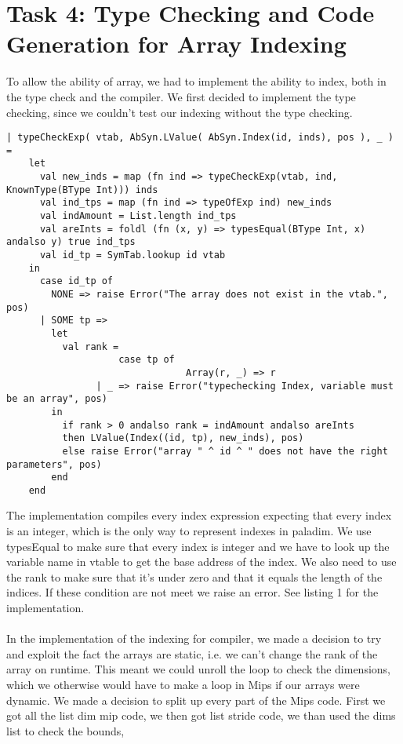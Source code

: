 \section{Task 4: Type Checking and Code Generation for Array Indexing}

To allow the ability of array, we had to implement the ability to index, both in the type check and the compiler. We first decided to implement
the type checking, since we couldn't test our indexing without the type checking.

\begin{lstlisting}[style=MLStyle, caption=type checking for indexing]		
| typeCheckExp( vtab, AbSyn.LValue( AbSyn.Index(id, inds), pos ), _ ) =
    let 
      val new_inds = map (fn ind => typeCheckExp(vtab, ind, KnownType(BType Int))) inds
      val ind_tps = map (fn ind => typeOfExp ind) new_inds
      val indAmount = List.length ind_tps
      val areInts = foldl (fn (x, y) => typesEqual(BType Int, x) andalso y) true ind_tps
      val id_tp = SymTab.lookup id vtab
    in
      case id_tp of 
        NONE => raise Error("The array does not exist in the vtab.", pos)
      | SOME tp => 
        let
          val rank = 
					case tp of
								Array(r, _) => r
                | _ => raise Error("typechecking Index, variable must be an array", pos)
        in
          if rank > 0 andalso rank = indAmount andalso areInts 
          then LValue(Index((id, tp), new_inds), pos)
          else raise Error("array " ^ id ^ " does not have the right parameters", pos)
        end
    end	
\end{lstlisting}
The implementation compiles every index expression expecting that every index is an integer, which is the only way to represent indexes in 
paladim. We use typesEqual to make sure that every index is integer and we have to look up the variable name in vtable to get the base address of the index. 
We also need to use the rank to make sure that it's under zero and that it equals the length of the indices. If these condition are not meet we raise an error. 
See listing 1 for the implementation.
\\
\\
In the implementation of the indexing for compiler, we made a decision to try and exploit the fact the arrays are static, i.e. we can't change
the rank of the array on runtime. This meant we could unroll the loop to check the dimensions, which we otherwise would have to make a loop in
Mips if our arrays were dynamic. We made a decision to split up every part of the Mips code.
First we got all the list dim mip code, we then got list stride code, we than used the dims list to check the bounds, 
